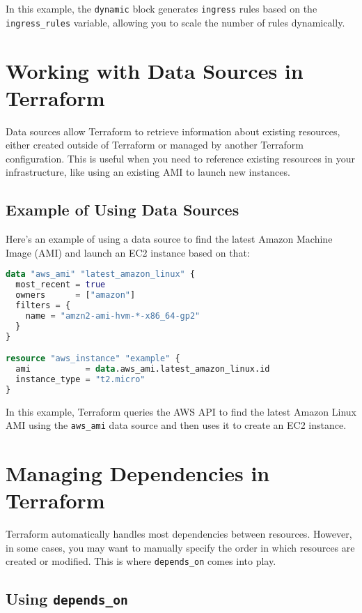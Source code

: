 In this example, the \texttt{dynamic} block generates \texttt{ingress} rules based on the \texttt{ingress\_rules} variable, allowing you to scale the number of rules dynamically.

\section{Working with Data Sources in Terraform}

Data sources allow Terraform to retrieve information about existing resources, either created outside of Terraform or managed by another Terraform configuration. This is useful when you need to reference existing resources in your infrastructure, like using an existing AMI to launch new instances.

\subsection{Example of Using Data Sources}

Here's an example of using a data source to find the latest Amazon Machine Image (AMI) and launch an EC2 instance based on that:

\begin{lstlisting}[language=terraform]
data "aws_ami" "latest_amazon_linux" {
  most_recent = true
  owners      = ["amazon"]
  filters = {
    name = "amzn2-ami-hvm-*-x86_64-gp2"
  }
}

resource "aws_instance" "example" {
  ami           = data.aws_ami.latest_amazon_linux.id
  instance_type = "t2.micro"
}
\end{lstlisting}

In this example, Terraform queries the AWS API to find the latest Amazon Linux AMI using the \texttt{aws\_ami} data source and then uses it to create an EC2 instance.

\section{Managing Dependencies in Terraform}

Terraform automatically handles most dependencies between resources. However, in some cases, you may want to manually specify the order in which resources are created or modified. This is where \texttt{depends\_on} comes into play.

\subsection{Using \texttt{depends\_on}}

